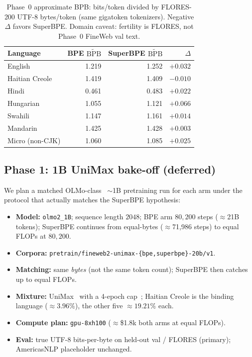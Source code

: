 \documentclass[11pt,a4paper]{article}
\begin{document}
\begin{table}[t]
\centering
\caption{Phase~0 approximate BPB: bits/token divided by FLORES-200 UTF-8 bytes/token
(same gigatoken tokenizers). Negative $\Delta$ favors SuperBPE.
Domain caveat: fertility is FLORES, not Phase~0 FineWeb val text.}
\label{tab:phase0-approx-bpb}
\small
\begin{tabular}{@{}lrrr@{}}
\toprule
Language & BPE $\widetilde{\mathrm{BPB}}$ & SuperBPE $\widetilde{\mathrm{BPB}}$ & $\Delta$ \\
\midrule
English        & 1.219 & 1.252 & $+0.032$ \\
Haitian Creole & 1.419 & 1.409 & $-0.010$ \\
Hindi          & 0.461 & 0.483 & $+0.022$ \\
Hungarian      & 1.055 & 1.121 & $+0.066$ \\
Swahili        & 1.147 & 1.161 & $+0.014$ \\
Mandarin       & 1.425 & 1.428 & $+0.003$ \\
\midrule
Micro (non-CJK)& 1.060 & 1.085 & $+0.025$ \\
\bottomrule
\end{tabular}
\end{table}

\subsection{Phase 1: 1B UniMax bake-off (deferred)}
\label{sec:phase1}

We plan a matched OLMo-class~\citep{olmo2025} $\sim$1B pretraining run for each arm under the protocol that actually matches the SuperBPE hypothesis:

\begin{itemize}[leftmargin=*,itemsep=2pt]
  \item \textbf{Model:} \texttt{olmo2\_1B}; sequence length $2048$; BPE arm $80{,}200$ steps ($\approx$21B tokens); SuperBPE continues from equal-bytes ($\approx$71{,}986 steps) to equal FLOPs at $80{,}200$.
  \item \textbf{Corpora:} \texttt{pretrain/fineweb2-unimax-\{bpe,superbpe\}-20b/v1}.
  \item \textbf{Matching:} same \emph{bytes} (not the same token count); SuperBPE then catches up to equal FLOPs.
  \item \textbf{Mixture:} UniMax~\citep{chung2023unimax} with a 4-epoch cap~\citep{muennighoff2023scaling}; Haitian Creole is the binding language ($\approx 3.96\%$), the other five $\approx 19.21\%$ each.
  \item \textbf{Compute plan:} \texttt{gpu-8xh100} ($\approx$\$1.8k both arms at equal FLOPs).
  \item \textbf{Eval:} true UTF-8 bits-per-byte on held-out val / FLORES (primary); AmericasNLP placeholder unchanged.
\end{itemize}
\end{document}
